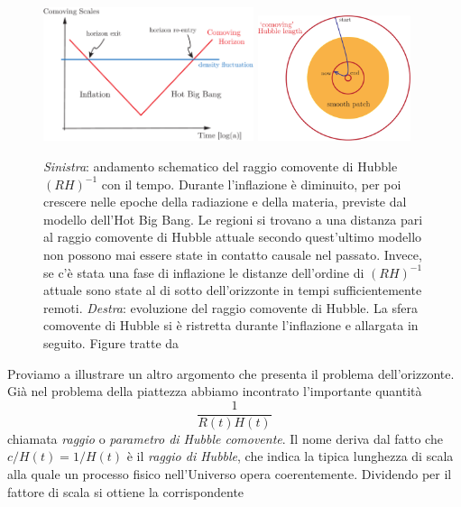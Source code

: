 \begin{figure}
  \centering
  \includegraphics[width=0.55\textwidth]{figure/scales}\hfill
  \includegraphics[width=0.4\textwidth]{figure/horizon}
  \caption[Come l'inflazione risolve il problema
  dell'orizzonte]{\emph{Sinistra}: andamento schematico del raggio comovente di
    Hubble \((RH)^{-1}\) con il tempo.  Durante l'inflazione è diminuito, per
    poi crescere nelle epoche della radiazione e della materia, previste dal
    modello dell'Hot Big Bang.  Le regioni si trovano a una distanza pari al
    raggio comovente di Hubble attuale secondo quest'ultimo modello non possono
    mai essere state in contatto causale nel passato.  Invece, se c'è stata una
    fase di inflazione le distanze dell'ordine di \((RH)^{-1}\) attuale sono
    state al di sotto dell'orizzonte in tempi sufficientemente remoti.
    \emph{Destra}: evoluzione del raggio comovente di Hubble.  La sfera
    comovente di Hubble si è ristretta durante l'inflazione e allargata in
    seguito.  Figure tratte da~\cite[27]{2009arXiv0907.5424B}}
  \label{fig:orizzonte}
\end{figure}
Proviamo a illustrare un altro argomento che presenta il problema
dell'orizzonte.  Già nel problema della piattezza abbiamo incontrato
l'importante quantità
\begin{equation}
  \frac{1}{R(t)H(t)}
\end{equation}
chiamata \emph{raggio} o \emph{parametro di Hubble comovente}.  Il nome deriva
dal fatto che \(c/H(t) = 1/H(t)\) è il \emph{raggio di Hubble}, che indica la
tipica lunghezza di scala alla quale un processo fisico nell'Universo opera
coerentemente.  Dividendo per il fattore di scala si ottiene la corrispondente
